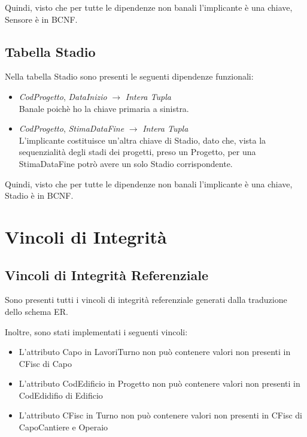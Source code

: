 \documentclass[12pt,a4paper]{report}
\begin{document}
        Quindi, visto che per tutte le dipendenze non banali l’implicante è una chiave, Sensore è in BCNF.

        \section{Tabella Stadio}
        
        Nella tabella Stadio sono presenti le seguenti dipendenze funzionali:

        \begin{itemize}
            \item \emph{CodProgetto}, \emph{DataInizio} $\rightarrow$ \emph{Intera Tupla} \\ Banale poichè ho la chiave primaria a sinistra.
            
            \item \emph{CodProgetto}, \emph{StimaDataFine} $\rightarrow$ \emph{Intera Tupla} \\ L'implicante costituisce un'altra chiave di Stadio, dato che, vista la sequenzialità degli stadi dei progetti, preso un Progetto, per una \emph{}StimaDataFine potrò avere un solo Stadio corrispondente.
        \end{itemize}

        Quindi, visto che per tutte le dipendenze non banali l’implicante è una chiave, Stadio è in BCNF.

    \chapter{Vincoli di Integrità}
        \section{Vincoli di Integrità Referenziale}
            Sono presenti tutti i vincoli di integrità referenziale generati dalla traduzione dello schema ER. 
            
            Inoltre, sono stati implementati i seguenti vincoli:
            \begin{itemize}
                \item L'attributo Capo in LavoriTurno non può contenere valori non presenti in CFisc di Capo
                \item L'attributo CodEdificio in Progetto non può contenere valori non presenti in CodEdidifio di Edificio
                \item L'attributo CFisc in Turno non può contenere valori non presenti in CFisc di CapoCantiere e Operaio
            \end{itemize}
\end{document}
